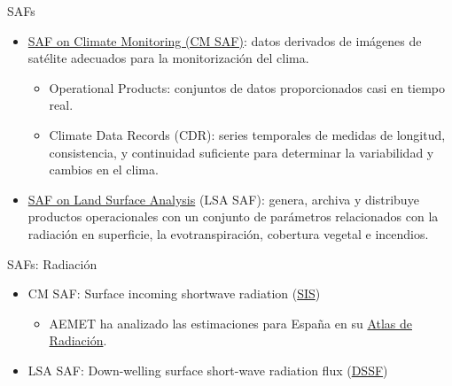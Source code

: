 \documentclass[aspectratio=169, usenames,svgnames,dvipsnames]{beamer}
\begin{document}
\begin{frame}[label={sec:org2aaf757}]{SAFs}
\begin{itemize}
\item \href{https://wui.cmsaf.eu/safira/action/viewProduktSearch}{SAF on Climate Monitoring (CM SAF)}: datos derivados de imágenes de satélite adecuados para la monitorización del clima.

\begin{itemize}
\item Operational Products: conjuntos de datos proporcionados casi en tiempo real.

\item Climate Data Records (CDR): series temporales de medidas de longitud, consistencia, y continuidad suficiente para determinar la variabilidad y cambios en el clima.
\end{itemize}

\item \href{https://landsaf.ipma.pt/en/}{SAF on Land Surface Analysis} (LSA SAF): genera, archiva y distribuye productos operacionales con un conjunto de parámetros relacionados con la radiación en superficie, la evotranspiración, cobertura vegetal e incendios.
\end{itemize}
\end{frame}

\begin{frame}[label={sec:orgefa3d10}]{SAFs: Radiación}
\begin{itemize}
\item \alert{CM SAF}: Surface incoming shortwave radiation (\href{https://wui.cmsaf.eu/safira/action/viewProduktDetails?eid=21987\_21988\&fid=27}{SIS})

\begin{itemize}
\item AEMET ha analizado las estimaciones para España en su \href{http://www.aemet.es/es/serviciosclimaticos/datosclimatologicos/atlas\_radiacion\_solar}{Atlas de Radiación}.
\end{itemize}

\item \alert{LSA SAF}: Down-welling surface short-wave radiation flux (\href{https://landsaf.ipma.pt/en/products/longwave-shortwave-radiation/dssf/}{DSSF})
\end{itemize}
\end{frame}
\end{document}
